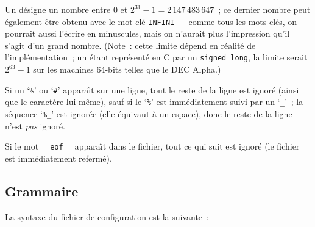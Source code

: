 \documentclass[10pt]{article}
\begin{document}
	Un  d\'esigne un nombre entre $0$ et $2^{31}-1 =
2\,147\,483\,647$~; ce dernier nombre peut \'egalement \^etre obtenu
avec le mot-cl\'e \verb|INFINI| --- comme tous les mots-cl\'es, on
pourrait aussi l'\'ecrire en minuscules, mais on n'aurait plus
l'impression qu'il s'agit d'un grand nombre.  (Note~: cette limite
d\'epend en r\'ealit\'e de l'impl\'ementation~; un  \'etant
repr\'esent\'e en C par un \verb|signed long|, la limite serait
$2^{63}-1$ sur les machines 64-bits telles que le DEC Alpha.)

	Si un `\verb|%|' ou `\verb|#|' appara{\^\i}t sur une ligne, tout
le reste de la ligne est ignor\'e (ainsi que le caract\`ere lui-m\^eme),
sauf si le `\verb|%|' est imm\'ediatement suivi par un `\verb|_|'~; la
s\'equence `\verb|%_|' est ignor\'ee (elle \'equivaut \`a un espace),
donc le reste de la ligne n'est {\em pas\/} ignor\'e.

	Si le mot \verb|__eof__| appara{\^\i}t dans le fichier, tout
ce qui suit est ignor\'e (le fichier est imm\'ediatement referm\'e).

\subsection{Grammaire}

La syntaxe du fichier de configuration est la suivante~:

\medbreak

\end{document}
